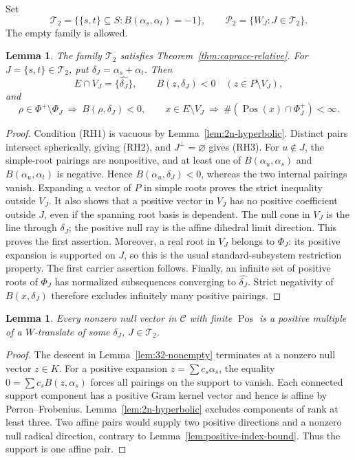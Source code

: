 \documentclass[11pt,reqno]{amsart}
\theoremstyle{plain}
\newtheorem{lemma}[theorem]{Lemma}
\theoremstyle{definition}
\theoremstyle{remark}
\numberwithin{equation}{section}
\DeclareMathOperator{\Pos}{Pos}
\begin{document}
Set
\[
 \mathcal T_2=\{\{s,t\}\subseteq S:B(\alpha_s,\alpha_t)=-1\},\qquad
 \mathcal P_2=\{W_J:J\in\mathcal T_2\}.
\]
The empty family is allowed.
\begin{lemma}\label{lem:2n-carriers}
The family $\mathcal T_2$ satisfies Theorem~\ref{thm:caprace-relative}. For $J=\{s,t\}\in\mathcal T_2$, put $\delta_J=\alpha_s+\alpha_t$. Then
\[
 E\cap V_J=\{\widehat{\delta_J}\},\qquad
 B(z,\delta_J)<0\quad(z\in P\setminus V_J),
\]
and
\[
 \rho\in\Phi^+\setminus\Phi_J\ \Longrightarrow\ B(\rho,\delta_J)<0,
 \qquad
 x\in E\setminus V_J\ \Longrightarrow\ \#(\Pos(x)\cap\Phi_J^+)<\infty.
\]
\end{lemma}
\begin{proof}
Condition (RH1) is vacuous by Lemma~\ref{lem:2n-hyperbolic}. Distinct pairs intersect spherically, giving (RH2), and $J^\perp=\varnothing$ gives (RH3).
For $u\notin J$, the simple-root pairings are nonpositive, and at least one of $B(\alpha_u,\alpha_s)$ and $B(\alpha_u,\alpha_t)$ is negative. Hence $B(\alpha_u,\delta_J)<0$, whereas the two internal pairings vanish. Expanding a vector of $P$ in simple roots proves the strict inequality outside $V_J$. It also shows that a positive vector in $V_J$ has no positive coefficient outside $J$, even if the spanning root basis is dependent.
The null cone in $V_J$ is the line through $\delta_J$; the positive null ray is the affine dihedral limit direction. This proves the first assertion. Moreover, a real root in $V_J$ belongs to $\Phi_J$: its positive expansion is supported on $J$, so this is the usual standard-subsystem restriction property. The first carrier assertion follows.
Finally, an infinite set of positive roots of $\Phi_J$ has normalized subsequences converging to $\widehat{\delta_J}$. Strict negativity of $B(x,\delta_J)$ therefore excludes infinitely many positive pairings.
\end{proof}

\begin{lemma}\label{lem:2n-finite-pos}
Every nonzero null vector in $\mathcal C$ with finite $\Pos$ is a positive multiple of a $W$-translate of some $\delta_J$, $J\in\mathcal T_2$.
\end{lemma}
\begin{proof}
The descent in Lemma~\ref{lem:32-nonempty} terminates at a nonzero null vector $z\in K$. For a positive expansion $z=\sum c_s\alpha_s$, the equality $0=\sum c_sB(z,\alpha_s)$ forces all pairings on the support to vanish. Each connected support component has a positive Gram kernel vector and hence is affine by Perron--Frobenius. Lemma~\ref{lem:2n-hyperbolic} excludes components of rank at least three. Two affine pairs would supply two positive directions and a nonzero null radical direction, contrary to Lemma~\ref{lem:positive-index-bound}. Thus the support is one affine pair.
\end{proof}
\end{document}
